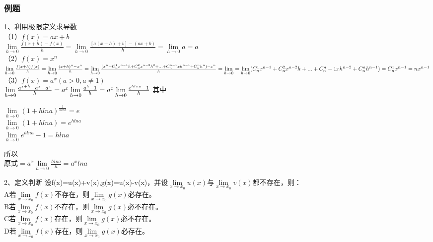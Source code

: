 \documentclass{ctexart}
\begin{document}
\subsubsection{例题}

1、利用极限定义求导数\\

（1）$f(x)=ax+b$\\

$\lim\limits_{h \rightarrow 0}\frac{f(x+h)-f(x)}{h}=\lim\limits_{h \rightarrow 0}\frac{[a(x+h)+b]-(ax+b)}{h}=\lim\limits_{h \rightarrow 0}a=a$
\\

（2）$f(x)=x^n$\\

$\lim\limits_{h \rightarrow 0}\frac{f(x+h)f(x)}{h}=\lim\limits_{h \rightarrow 0}\frac{(x+h)^n-x^n}{h}\\=\lim\limits_{h \rightarrow 0}\frac{(x^n+C_n^1x^{n-1}h+C_n^2x^{n-2}h^2+...+C_n^{n-1}xh^{n-1}+C_n^nh^n)-x^n}{h}\\=\lim\limits_{h \rightarrow 0}=\lim\limits_{h \rightarrow 0}(C_n^1x^{n-1}+C_n^2x^{n-2}h+...+C_n^n-1xh^{n-2}+C_n^nh^{n-1})\\=C_n^1x^{n-1}=nx^{n-1}$
\\

（3）$f(x)=a^x(a>0,a\neq 1)$\\

$\lim\limits_{h \rightarrow 0}\frac{a^{x+h}-a^x-a^x}{h}=a^x\lim\limits_{h \rightarrow 0}\frac{a^h-1}{h}=a^x\lim\limits_{h \rightarrow 0}\frac{e^{hlna}-1}{h}\\
$
其中
\begin{center}
$\lim\limits_{h\rightarrow 0} (1+hlna)^{\frac{1}{hlna}}=e$\\
$\lim\limits_{h\rightarrow 0}(1+hlna)=e^{hlna}$\\
$\lim\limits_{h\rightarrow 0}e^{hlna}-1=hlna$\\
\end{center}
所以\\
原式$=a^x\lim\limits_{h\rightarrow 0}\frac{hlna}{h}=a^xlna$

2、定义判断
设f(x)=u(x)+v(x),g(x)=u(x)-v(x)，并设$\lim\limits_{x\rightarrow x_0}u(x)$与$\lim\limits_{x\rightarrow x_0}v(x)$都不存在，则：\\
A若$\lim\limits_{x\rightarrow x_0}f(x)$不存在，则$\lim\limits_{x\rightarrow x_0}g(x)$必存在。\\
B若$\lim\limits_{x\rightarrow x_0}f(x)$不存在，则$\lim\limits_{x\rightarrow x_0}g(x)$必不存在。\\
C若$\lim\limits_{x\rightarrow x_0}f(x)$存在，则$\lim\limits_{x\rightarrow x_0}g(x)$必不存在。\\
D若$\lim\limits_{x\rightarrow x_0}f(x)$存在，则$\lim\limits_{x\rightarrow x_0}g(x)$必存在。\\
\end{document}
